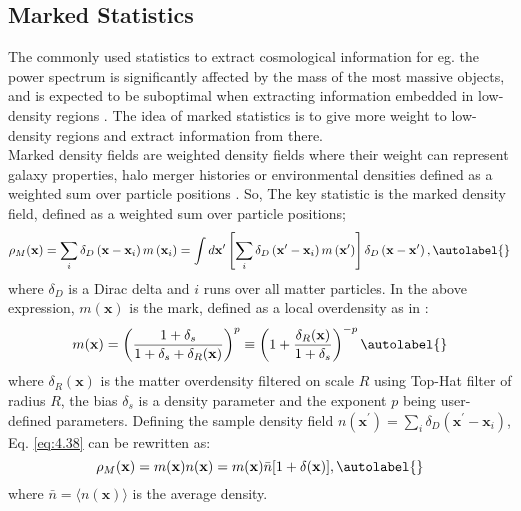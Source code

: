 \subsection{Marked Statistics} \label{Marked}
The commonly used statistics to extract cosmological information for eg. the power spectrum is significantly affected by the mass of the most massive objects, and is expected to be suboptimal when extracting information embedded in low-density regions \cite{Rimes_2005}. The idea of marked statistics is to give more weight to low-density regions and extract information from there.\\

Marked density fields are weighted density fields where their weight can represent galaxy properties, halo merger histories or environmental densities defined as a weighted sum over particle positions \cite{skibba2006MNRAS.369...68S, Balaguera_Antol_nez_2014, Beisbart_2000}. So, The key statistic is the marked density field, defined as a weighted sum over particle positions\cite{Philcox_2020};
\begin{equation}
    \rho_M(\mathbf{x})=\sum_i \delta_D\left(\mathbf{x}-\mathbf{x}_i\right) m\left(\mathbf{x}_i\right)=\int d \mathbf{x}^{\prime}\left[\sum_i \delta_D\left(\mathbf{x}^{\prime}-\mathbf{x}_i\right) m\left(\mathbf{x}^{\prime}\right)\right] \delta_D\left(\mathbf{x}-\mathbf{x}^{\prime}\right),\autolabel{}
\end{equation}
where $\delta_D$ is a Dirac delta and $i$ runs over all matter particles. In the above expression, $m(\mathbf{x})$ is the mark, defined as a local overdensity as in  \cite{Massara_2021}:
\begin{equation}
    m(\mathbf{x})=\left(\frac{1+\delta_s}{1+\delta_s+\delta_R(\mathbf{x})}\right)^p \equiv\left(1+\frac{\delta_R(\mathbf{x})}{1+\delta_s}\right)^{-p} \autolabel{}
\end{equation}
where $\delta_R(\mathbf{x})$ is the matter overdensity filtered on scale $R$ using Top-Hat filter of radius $R$, the bias $\delta_s$  is a density parameter and the exponent $p$ being user-defined parameters. Defining the sample density field $n\left(\mathbf{x}^{\prime}\right)=\sum_i \delta_D\left(\mathbf{x}^{\prime}-\mathbf{x}_i\right)$, Eq. \eqref{eq:4.38} can be rewritten as:
\begin{equation}
    \rho_M(\mathbf{x})=m(\mathbf{x}) n(\mathbf{x})=m(\mathbf{x}) \bar{n}[1+\delta(\mathbf{x})],\autolabel{}
\end{equation}
where $\bar{n}=\langle n(\mathbf{x})\rangle$ is the average density.
